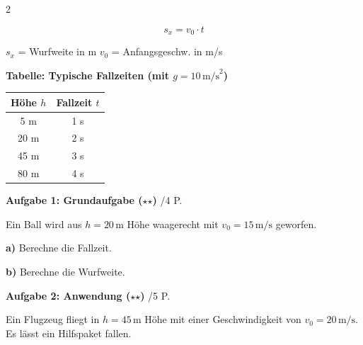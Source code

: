 \documentclass[10pt, a4paper]{article}
\newcommand{\fachfarbe}{physik}
\newcommand{\abschnitt}[1]{%
    \vspace{8pt}
    \noindent\textbf{\textcolor{\fachfarbe}{#1}}
    \vspace{4pt}
}
\newcommand{\punkte}[1]{\hfill\small\textcolor{grau}{/#1 P.}}
\newcommand{\stmark}{$\star$}
\begin{document}
\begin{multicols}{2}
\begin{formelbox}
\begin{equation*}
s_x = v_0 \cdot t
\end{equation*}

\vspace{2pt}
\small
$s_x$ = Wurfweite in m \quad $v_0$ = Anfangsgeschw. in m/s
\end{formelbox}

\vspace{6pt}


\abschnitt{Tabelle: Typische Fallzeiten (mit $g = 10\,\text{m/s}^2$)}

\begin{center}
\begin{tabular}{|c|c|}
\hline
\textbf{Höhe $h$} & \textbf{Fallzeit $t$} \\
\hline
5 m & 1 s \\
\hline
20 m & 2 s \\
\hline
45 m & 3 s \\
\hline
80 m & 4 s \\
\hline
\end{tabular}
\end{center}

\vspace{4pt}


\columnbreak

\abschnitt{Aufgabe 1: Grundaufgabe (\stmark\stmark)}\punkte{4}

Ein Ball wird aus $h = 20\,\text{m}$ Höhe waagerecht mit $v_0 = 15\,\text{m/s}$ geworfen.

\textbf{a)} Berechne die Fallzeit.

\vspace{2.5cm}

\textbf{b)} Berechne die Wurfweite.

\vspace{2.5cm}


\abschnitt{Aufgabe 2: Anwendung (\stmark\stmark)}\punkte{5}

Ein Flugzeug fliegt in $h = 45\,\text{m}$ Höhe mit einer Geschwindigkeit von $v_0 = 20\,\text{m/s}$. Es lässt ein Hilfspaket fallen.


\end{multicols}
\end{document}
